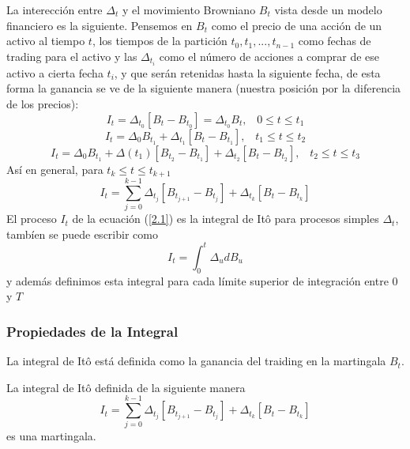 \documentclass[11pt,notitlepage]{article}
\begin{document}
La interección entre \(\Delta_{t}\) y  el movimiento Browniano \(B_t\) vista desde un modelo financiero es la siguiente. Pensemos en \(B_t\) como el precio de una acción de un activo al tiempo $t$, los tiempos de la partición \(t_0,t_1,..., t_{n-1}\) como fechas de trading para el activo y las \(\Delta_{t_i}\) como el número de acciones a comprar de ese activo a cierta fecha \(t_i\), y que serán retenidas hasta la siguiente fecha, de esta forma la ganancia se ve de la siguiente manera (nuestra posición por la diferencia de los precios):
\[I_{t}=\Delta_{t_0}\left [ B_t-B_{t_{0}} \right ]=\Delta_{t_0}B_t, \;\;\; 0\leq t\leq t_1\]
\[I_{t}=\Delta_{0} B_{t_{1}}+ \Delta_{t_1}\left [ B_{t}-B_{t_{1}} \right ], \;\;\; t_1\leq t\leq t_2\]
\[I_{t}=\Delta_{0} B_{t_{1}}+ \Delta (t_1)\left [ B_{t_{2}}-B_{t_{1}} \right ]+ \Delta_{t_2}\left [ B_t-B_{t_{2}} \right ], \;\;\; t_2\leq t\leq t_3\]
Así en general, para \(t_k\leq t\leq t_{k+1}\)
\begin{equation} \label{2.1}
I_{t}=\sum_{j=0}^{k-1}\Delta_{t_j}\left [ B_{t_{j+1}}-B_{t_{j}} \right ]+\Delta_{t_k}\left [ B_t-B_{t_{k}} \right ]
\end{equation}
El proceso \(I_{t}\) de la ecuación (\ref{2.1}) es la integral de Itô para procesos simples \(\Delta_{t}\), tambíen se puede escribir  como
\[I_{t}=\int_{0}^{t}\Delta_{u}dB_u\]
y además definimos esta integral para cada límite superior de integración entre $0$  y \(T\)



\subsubsection{Propiedades de la Integral} 
La integral de Itô está definida como la ganancia del traiding en la martingala \(B_t\). \\

\begin{teor}
La integral de Itô definida de la siguiente manera
\[ I_{t}=\sum_{j=0}^{k-1}\Delta_{t_j}\left [ B_{t_{j+1}}-B_{t_{j}} \right ]+\Delta_{t_k}\left [B_t-B_{t_{k}} \right ]\]
es una martingala. 
\end{teor}
\end{document}
